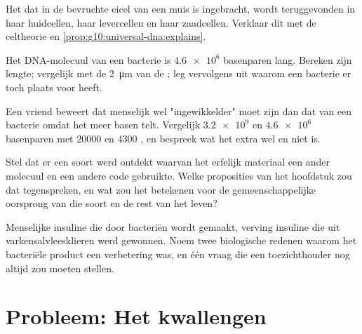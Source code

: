 \begin{exercise}[$\star\star$]\label{exo:g10:universal-dna:11}
Het  dat in de bevruchte eicel van een muis is ingebracht, wordt
teruggevonden in haar huidcellen, haar levercellen en haar zaadcellen.
Verklaar dit met de celtheorie en
\cref{prop:g10:universal-dna:explains}.
\end{exercise}

\begin{exercise}[$\star\star\star$]\label{exo:g10:universal-dna:12}
Het DNA-molecuul van een bacterie is $\num{4.6e6}$ basenparen lang.
Bereken zijn lengte; vergelijk met de \qty{2}{\micro m} van de ; leg
vervolgens uit waarom een bacterie er toch plaats voor heeft.
\end{exercise}

\begin{exercise}[$\star\star\star$]\label{exo:g10:universal-dna:13}
Een vriend beweert dat menselijk  wel "ingewikkelder" moet zijn dan
dat van een bacterie omdat het meer basen telt. Vergelijk $\num{3.2e9}$
en $\num{4.6e6}$ basenparen met $\num{20000}$ en 4300 , en bespreek
wat het extra  wel en niet is.
\end{exercise}

\begin{exercise}[$\star\star\star$]\label{exo:g10:universal-dna:14}
Stel dat er een soort werd ontdekt waarvan het erfelijk materiaal een
ander molecuul en een andere code gebruikte. Welke proposities van het
hoofdstuk zou dat tegenspreken, en wat zou het betekenen voor de
gemeenschappelijke oorsprong van die soort en de rest van het leven?
\end{exercise}

\begin{exercise}[$\star\star\star$]\label{exo:g10:universal-dna:15}
Menselijke insuline die door bacteriën wordt gemaakt, verving insuline
die uit varkensalvleesklieren werd gewonnen. Noem twee biologische
redenen waarom het bacteriële product een verbetering was, en één vraag
die een toezichthouder nog altijd zou moeten stellen.
\end{exercise}

\section{Probleem: Het kwallengen}

